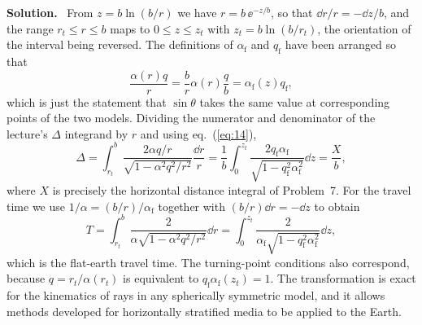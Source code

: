 \documentclass[a4paper,12pt]{paper}
\newenvironment{solution}{\par\noindent\textbf{Solution.}\ }{\par\medskip}
\begin{document}
\begin{solution}
From $z=b\ln(b/r)$ we have $r=b\,\ee^{-z/b}$, so that $\dd r/r=-\dd z/b$, and the range
$r_{t}\le r\le b$ maps to $0\le z\le z_{t}$ with $z_{t}=b\ln(b/r_{t})$, the orientation of the
interval being reversed. The definitions of $\alpha_{\mathrm{f}}$ and $q_{\mathrm{f}}$ have been
arranged so that
\begin{equation}
\frac{\alpha(r)q}{r}=\frac{b}{r}\alpha(r)\frac{q}{b}=\alpha_{\mathrm{f}}(z)q_{\mathrm{f}},
\label{eq:14}
\end{equation}
which is just the statement that $\sin\theta$ takes the same value at corresponding points of
the two models. Dividing the numerator and denominator of the lecture's $\Delta$ integrand by
$r$ and using eq.~(\ref{eq:14}),
\begin{equation}
\Delta=\int_{r_{t}}^{b}\frac{2\alpha q/r}{\sqrt{1-\alpha^{2}q^{2}/r^{2}}}\frac{\dd r}{r}
=\frac{1}{b}\int_{0}^{z_{t}}\frac{2q_{\mathrm{f}}\alpha_{\mathrm{f}}}{\sqrt{1-q_{\mathrm{f}}^{2}\alpha_{\mathrm{f}}^{2}}}\dd z
=\frac{X}{b},
\label{eq:15}
\end{equation}
where $X$ is precisely the horizontal distance integral of Problem~7. For the travel time we
use $1/\alpha=(b/r)/\alpha_{\mathrm{f}}$ together with $(b/r)\dd r=-\dd z$ to obtain
\begin{equation}
T=\int_{r_{t}}^{b}\frac{2}{\alpha\sqrt{1-\alpha^{2}q^{2}/r^{2}}}\dd r
=\int_{0}^{z_{t}}\frac{2}{\alpha_{\mathrm{f}}\sqrt{1-q_{\mathrm{f}}^{2}\alpha_{\mathrm{f}}^{2}}}\dd z,
\label{eq:16}
\end{equation}
which is the flat-earth travel time. The turning-point conditions also correspond, because
$q=r_{t}/\alpha(r_{t})$ is equivalent to $q_{\mathrm{f}}\alpha_{\mathrm{f}}(z_{t})=1$. The
transformation is exact for the kinematics of rays in any spherically symmetric model, and it
allows methods developed for horizontally stratified media to be applied to the Earth.


\end{solution}
\end{document}
